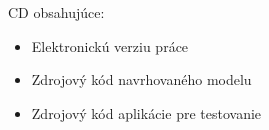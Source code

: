 CD obsahujúce:
\begin{itemize}
\item Elektronickú verziu práce
\item Zdrojový kód navrhovaného modelu
\item Zdrojový kód aplikácie pre testovanie
\end{itemize}
